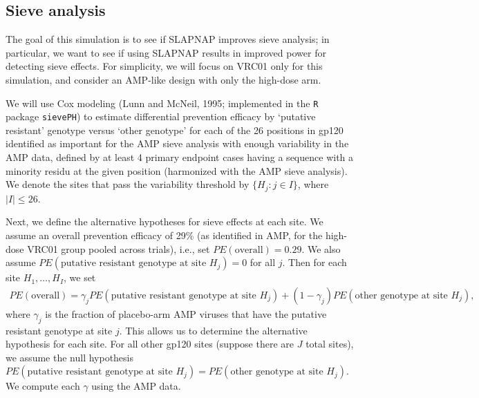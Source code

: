 \documentclass[10pt]{article}
\begin{document}
\subsection{Sieve analysis}

The goal of this simulation is to see if SLAPNAP improves sieve analysis; in particular, we want to see if using SLAPNAP results in improved power for detecting sieve effects. For simplicity, we will focus on VRC01 only for this simulation, and consider an AMP-like design with only the high-dose arm.

We will use Cox modeling (Lunn and McNeil, 1995; implemented in the \texttt{R} package \texttt{sievePH}) to estimate differential prevention efficacy by `putative resistant' genotype versus `other genotype' for each of the 26 positions in gp120 identified as important for the AMP sieve analysis with enough variability in the AMP data, defined by at least 4 primary endpoint cases having a sequence with a minority residu at the given position (harmonized with the AMP sieve analysis). We denote the sites that pass the variability threshold by $\{H_j: j \in I\}$, where $\lvert I \rvert \leq 26$.

Next, we define the alternative hypotheses for sieve effects at each site. We assume an overall prevention efficacy of 29\% (as identified in AMP, for the high-dose VRC01 group pooled across trials), i.e., set $PE(\text{overall}) = 0.29$. We also assume $PE(\text{putative resistant genotype at site } H_j) = 0$ for all $j$. Then for each site $H_1,\ldots,H_I$, we set
\begin{align*}
    PE(\text{overall}) = \gamma_j PE(\text{putative resistant genotype at site } H_j) + (1 - \gamma_j)PE(\text{other genotype at site } H_j),
\end{align*}
where $\gamma_j$ is the fraction of placebo-arm AMP viruses that have the putative resistant genotype at site $j$. This allows us to determine the alternative hypothesis for each site. For all other gp120 sites (suppose there are $J$ total sites), we assume the null hypothesis $PE(\text{putative resistant genotype at site } H_j) = PE(\text{other genotype at site } H_j)$. We compute each $\gamma$ using the AMP data.
\end{document}
